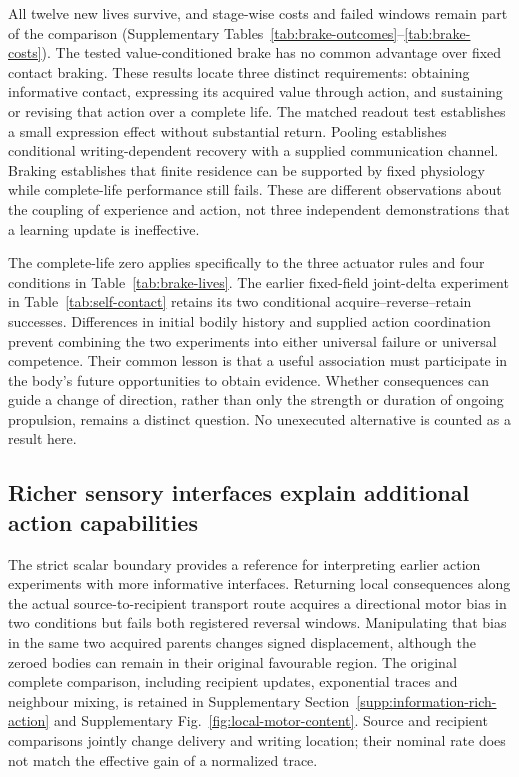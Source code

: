 All twelve new lives survive, and stage-wise costs and failed windows remain part of the comparison (Supplementary Tables~\ref{tab:brake-outcomes}--\ref{tab:brake-costs}). The tested value-conditioned brake has no common advantage over fixed contact braking. These results locate three distinct requirements: obtaining informative contact, expressing its acquired value through action, and sustaining or revising that action over a complete life. The matched readout test establishes a small expression effect without substantial return. Pooling establishes conditional writing-dependent recovery with a supplied communication channel. Braking establishes that finite residence can be supported by fixed physiology while complete-life performance still fails. These are different observations about the coupling of experience and action, not three independent demonstrations that a learning update is ineffective.

The complete-life zero applies specifically to the three actuator rules and four conditions in Table~\ref{tab:brake-lives}. The earlier fixed-field joint-delta experiment in Table~\ref{tab:self-contact} retains its two conditional acquire--reverse--retain successes. Differences in initial bodily history and supplied action coordination prevent combining the two experiments into either universal failure or universal competence. Their common lesson is that a useful association must participate in the body's future opportunities to obtain evidence. Whether consequences can guide a change of direction, rather than only the strength or duration of ongoing propulsion, remains a distinct question. No unexecuted alternative is counted as a result here.


\subsection*{Richer sensory interfaces explain additional action capabilities}

The strict scalar boundary provides a reference for interpreting earlier action experiments with more informative interfaces. Returning local consequences along the actual source-to-recipient transport route acquires a directional motor bias in two conditions but fails both registered reversal windows. Manipulating that bias in the same two acquired parents changes signed displacement, although the zeroed bodies can remain in their original favourable region. The original complete comparison, including recipient updates, exponential traces and neighbour mixing, is retained in Supplementary Section~\ref{supp:information-rich-action} and Supplementary Fig.~\ref{fig:local-motor-content}. Source and recipient comparisons jointly change delivery and writing location; their nominal rate does not match the effective gain of a normalized trace.

